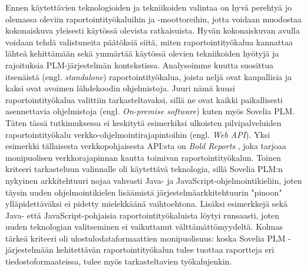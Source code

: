 Ennen käytettävien teknologioiden ja tekniikoiden valintaa on hyvä perehtyä jo olemassa oleviin raportointityökaluihin ja -moottoreihin, jotta voidaan muodostaa kokonaiskuva yleisesti käytössä olevista ratkaisuista. Hyvän kokonaiskuvan avulla voidaan tehdä valistuneita päätöksiä siitä, miten raportointityökalua kannattaa lähteä kehittämään sekä ymmärtää käytössä olevien tekniikoiden hyötyjä ja rajoituksia PLM-järjestelmän kontekstissa. Analysoimme kuutta suosittua itsenäistä (engl. \textit{standalone}) raportointityökalua, joista neljä ovat kaupallisia ja kaksi ovat avoimen lähdekoodin ohjelmistoja. Juuri nämä kuusi raportointityökalua valittiin tarkasteltavaksi, sillä ne ovat kaikki paikallisesti asennettavia ohjelmistoja (engl. \textit{On-premise software}) kuten myös Sovelia PLM. Täten tässä tutkimuksessa ei keskitytä esimerkiksi ulkoisten pilvipalveluiden raportointityökalu verkko-ohjelmointirajapintoihin (engl. \textit{Web API}). Yksi esimerkki tällaisesta verkkopohjaisesta API:sta on \textit{Bold Reports} \cite{noauthor_bi_2022}, joka tarjoaa monipuolisen verkkorajapinnan kautta toimivan raportointityökalun. Toinen kriteeri tarkasteluun valinnalle oli käytettävä teknologia, sillä Sovelia PLM:n nykyinen arkkitehtuuri nojaa vahvasti Java- ja JavaScript-ohjelmointikieliin, joten täysin uuden ohjelmointikielen lisäämistä järjestelmäarkkitehtuurin "pinoon"  ylläpidettäväksi ei pidetty mielekkäänä vaihtoehtona. Lisäksi esimerkkejä sekä Java- että JavaScript-pohjaisia raportointityökaluista löytyi runsaasti, joten uuden teknologian valitseminen ei vaikuttanut välttämättömyydeltä. Kolmas tärkeä kriteeri oli ulostulodataformaattien monipuolisuus: koska Sovelia PLM -järjestelmään kehitettävän raportointityökalun tulee tuottaa raportteja eri tiedostoformaateissa, tulee myös tarkasteltavien työkalujenkin.

